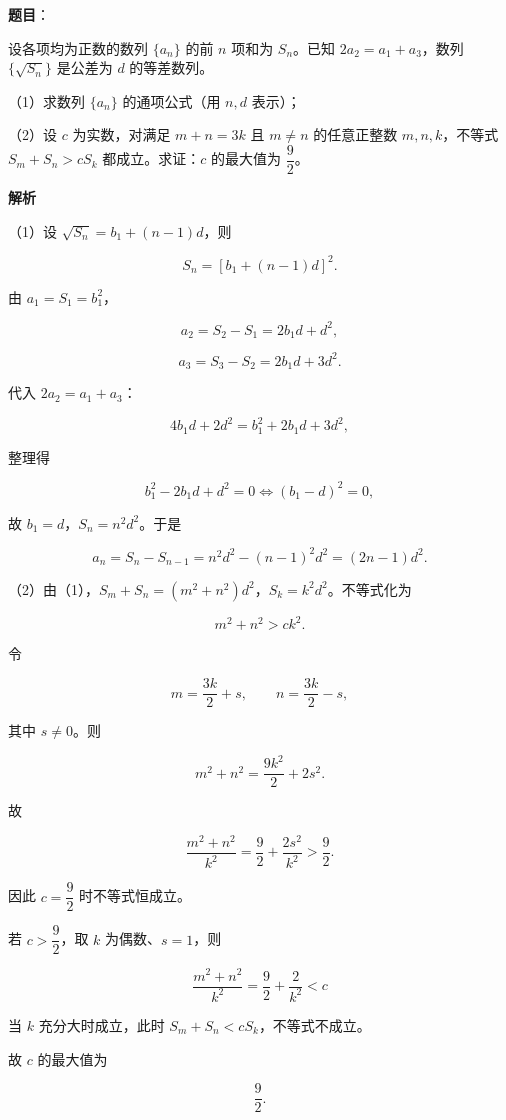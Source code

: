 \begin{answer}

\textbf{题目}：

设各项均为正数的数列 $\{a_n\}$ 的前 $n$ 项和为 $S_n$。已知 $2a_2=a_1+a_3$，数列 $\{\sqrt{S_n}\}$ 是公差为 $d$ 的等差数列。

（1）求数列 $\{a_n\}$ 的通项公式（用 $n,d$ 表示）；

（2）设 $c$ 为实数，对满足 $m+n=3k$ 且 $m\neq n$ 的任意正整数 $m,n,k$，不等式 $S_m+S_n>cS_k$ 都成立。求证：$c$ 的最大值为 $\dfrac92$。

\textbf{解析}

（1）设 $\sqrt{S_n}=b_1+(n-1)d$，则

\nopagebreak[4]
\[S_n=[b_1+(n-1)d]^2.\]

由 $a_1=S_1=b_1^2$，

\nopagebreak[4]
\[a_2=S_2-S_1=2b_1d+d^2,\]

\nopagebreak[4]
\[a_3=S_3-S_2=2b_1d+3d^2.\]

代入 $2a_2=a_1+a_3$：

\nopagebreak[4]
\[4b_1d+2d^2=b_1^2+2b_1d+3d^2,\]

整理得

\nopagebreak[4]
\[b_1^2-2b_1d+d^2=0\iff (b_1-d)^2=0,\]

故 $b_1=d$，$S_n=n^2d^2$。于是

\nopagebreak[4]
\[a_n=S_n-S_{n-1}=n^2d^2-(n-1)^2d^2=(2n-1)d^2.\]

（2）由（1），$S_m+S_n=(m^2+n^2)d^2$，$S_k=k^2d^2$。不等式化为

\nopagebreak[4]
\[m^2+n^2>c k^2.\]

令

\nopagebreak[4]
\[m=\frac{3k}2+s,\qquad n=\frac{3k}2-s,\]

其中 $s\neq0$。则

\nopagebreak[4]
\[m^2+n^2=\frac{9k^2}2+2s^2.\]

故

\nopagebreak[4]
\[\frac{m^2+n^2}{k^2}=\frac92+\frac{2s^2}{k^2}>\frac92.\]

因此 $c=\dfrac92$ 时不等式恒成立。

若 $c>\dfrac92$，取 $k$ 为偶数、$s=1$，则

\nopagebreak[4]
\[\frac{m^2+n^2}{k^2}=\frac92+\frac2{k^2}<c\]

当 $k$ 充分大时成立，此时 $S_m+S_n<cS_k$，不等式不成立。

故 $c$ 的最大值为

\nopagebreak[4]
\[\frac92.\]


\end{answer}
